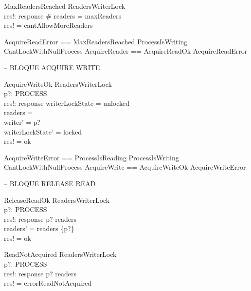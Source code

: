 \documentclass{article}
\begin{document}
\begin{schema}{MaxReadersReached}
    \Xi ReadersWriterLock \\
    res!: response
\where
    \# readers = maxReaders \\
    res! = cantAllowMoreReaders
\end{schema}

\begin{zed}
AcquireReadError == MaxReadersReached \lor ProcessIsWriting \\
\quad \lor CantLockWithNullProcess
\also
AcquireReader == AcquireReadOk \lor AcquireReadError 
\end{zed}

-- BLOQUE ACQUIRE WRITE

\begin{schema}{AcquireWriteOk}
    \Delta ReadersWriterLock \\
    p?: PROCESS \\
    res!: response
\where
    writerLockState = unlocked \\
    readers = \emptyset \\
    writer' = p? \\
    writerLockState' = locked \\
    res! = ok
\end{schema}

\begin{zed}
AcquireWriteError == ProcessIsReading \lor ProcessIsWriting \\
\quad \lor CantLockWithNullProcess
\also
AcquireWrite == AcquireWriteOk \lor AcquireWriteError 
\end{zed}

-- BLOQUE RELEASE READ

\begin{schema}{ReleaseReadOk}
    \Delta ReadersWriterLock \\
    p?: PROCESS \\
    res!: response
\where
    p? \in readers \\
    readers' = readers \setminus \{p?\} \\
    res! = ok
\end{schema}

\begin{schema}{ReadNotAcquired}
    \Xi ReadersWriterLock \\
    p?: PROCESS \\
    res!: response
\where
    p? \notin readers \\
    res! = errorReadNotAcquired
\end{schema}
\end{document}
